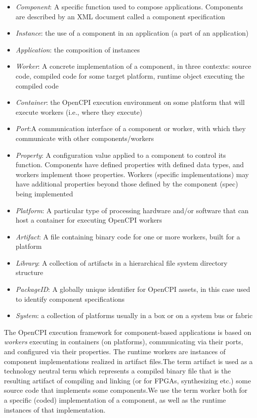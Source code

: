 \documentclass[10pt, a4paper, oneside]{article}
\renewcommand\_{\textunderscore\allowbreak} %
\begin{document}
\begin{itemize}
	\item[] \emph{Component}: A specific function used to compose applications. Components are described by an XML document called a component specification
	\item[] \emph{Instance}: the use of a component in an application (a part of an application)
	\item[] \emph {Application}: the composition of instances
	\item[] \emph {Worker}: A concrete implementation of a component, in three contexts:  source code, compiled code for some target platform, runtime object executing the compiled code
	\item[] \emph {Container}: the OpenCPI execution environment on some platform that will execute workers (i.e., where they execute)
	\item[] \emph {Port}:A communication interface of a component or worker, with which they communicate with other components/workers
	\item[] \emph {Property}: A configuration value applied to a component to control its function. Components have defined properties with defined data types, and workers implement those properties.  Workers (specific implementations) may have additional properties beyond those defined by the component (spec) being implemented
	\item[] \emph {Platform}: A particular type of processing hardware and/or software that can host a container for executing OpenCPI workers
	\item[] \emph {Artifact}: A file containing binary code for one or more workers, built for a platform
	\item[] \emph {Library}: A collection of artifacts in a hierarchical file system directory structure
	\item[] \emph {PackageID}: A globally unique identifier for OpenCPI assets, in this case used to identify component specifications
	\item[] \emph{System}: a collection of platforms usually in a box or on a system bus or fabric 
\end{itemize}
The OpenCPI execution framework for component-based applications is based on \emph{workers} executing in containers (on platforms), communicating via their ports, and configured via their properties. The runtime workers are instances of component implementations realized in artifact files.The term artifact is used as a technology neutral term which represents a compiled binary file that is the resulting artifact of compiling and linking (or for FPGAs, synthesizing etc.) some source code that implements some components.We use the term worker both for a specific (coded) implementation of a component, as well as the runtime instances of that implementation.\\
\end{document}
